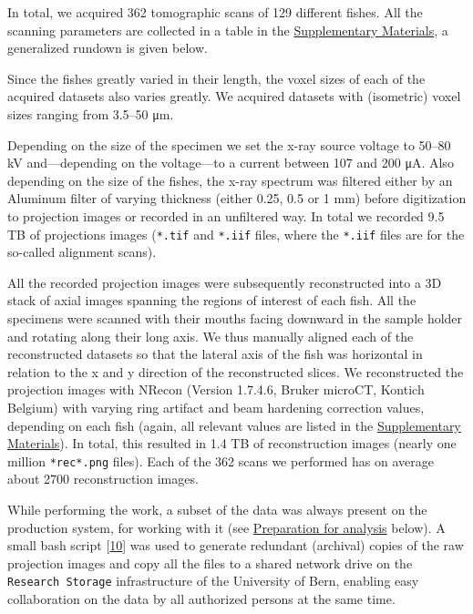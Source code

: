 In total, we acquired 362 tomographic scans of 129 different fishes.
All the scanning parameters are collected in a table in the \protect\hyperlink{supplementary-materials}{Supplementary Materials}, a generalized rundown is given below.

Since the fishes greatly varied in their length, the voxel sizes of each of the acquired datasets also varies greatly.
We acquired datasets with (isometric) voxel sizes ranging from 3.5--50 μm.

Depending on the size of the specimen we set the x-ray source voltage to 50--80 kV and---depending on the voltage---to a current between 107 and 200 μA.
Also depending on the size of the fishes, the x-ray spectrum was filtered either by an Aluminum filter of varying thickness (either 0.25, 0.5 or 1 mm) before digitization to projection images or recorded in an unfiltered way.
In total we recorded 9.5 TB of projections images (\texttt{*.tif} and \texttt{*.iif} files, where the \texttt{*.iif} files are for the so-called alignment scans).

All the recorded projection images were subsequently reconstructed into a 3D stack of axial images spanning the regions of interest of each fish.
All the specimens were scanned with their mouths facing downward in the sample holder and rotating along their long axis.
We thus manually aligned each of the reconstructed datasets so that the lateral axis of the fish was horizontal in relation to the x and y direction of the reconstructed slices.
We reconstructed the projection images with NRecon (Version 1.7.4.6, Bruker microCT, Kontich Belgium) with varying ring artifact and beam hardening correction values, depending on each fish (again, all relevant values are listed in the \protect\hyperlink{supplementary-materials}{Supplementary Materials}).
In total, this resulted in 1.4 TB of reconstruction images (nearly one million \texttt{*rec*.png} files).
Each of the 362 scans we performed has on average about 2700 reconstruction images.

While performing the work, a subset of the data was always present on the production system, for working with it (see \protect\hyperlink{preparation-for-analysis}{Preparation for analysis} below).
A small bash script {[}\protect\hyperlink{ref-ZjgrPHTa}{10}{]} was used to generate redundant (archival) copies of the raw projection images and copy all the files to a shared network drive on the \texttt{Research\ Storage} infrastructure of the University of Bern, enabling easy collaboration on the data by all authorized persons at the same time.

